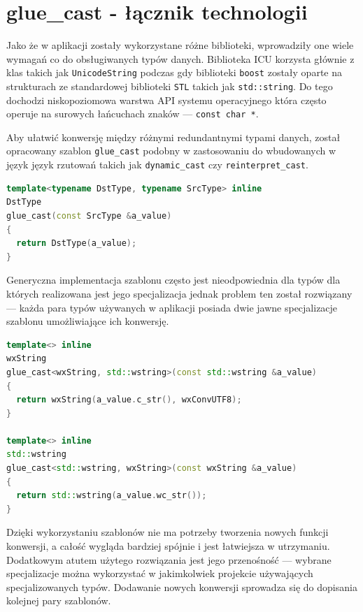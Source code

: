 \section{glue\_cast - łącznik technologii}
Jako że w aplikacji zostały wykorzystane różne biblioteki, wprowadziły one wiele wymagań co do obsługiwanych typów danych.
Biblioteka ICU korzysta głównie z klas takich jak \texttt{UnicodeString} podczas gdy biblioteki \texttt{boost} zostały oparte na strukturach ze standardowej biblioteki \texttt{STL} takich jak \texttt{std::string}. Do tego dochodzi niskopoziomowa warstwa API systemu operacyjnego która często operuje na surowych łańcuchach znaków --- \texttt{const char *}.
\par
Aby ułatwić konwersję między różnymi redundantnymi typami danych, został opracowany szablon \texttt{glue\_cast} podobny w zastosowaniu do wbudowanych w język język rzutowań takich jak \texttt{dynamic\_cast} czy \texttt{reinterpret\_cast}.

\begin{lstlisting}[caption={ glue.hpp}, language=C++]
template<typename DstType, typename SrcType> inline
DstType
glue_cast(const SrcType &a_value)
{
  return DstType(a_value);
}
\end{lstlisting}

\par
Generyczna implementacja szablonu często jest nieodpowiednia dla typów dla których realizowana jest jego specjalizacja jednak problem ten został rozwiązany --- każda para typów używanych w aplikacji posiada dwie jawne specjalizacje szablonu umożliwiające ich konwersję.
\begin{lstlisting}[caption={ Fragment glue\_impl.hpp --- specjalizacja dla std::wstring i wxString}, language=C++]
template<> inline
wxString
glue_cast<wxString, std::wstring>(const std::wstring &a_value)
{
  return wxString(a_value.c_str(), wxConvUTF8);
}

template<> inline
std::wstring
glue_cast<std::wstring, wxString>(const wxString &a_value)
{
  return std::wstring(a_value.wc_str());
}

\end{lstlisting}

\par
Dzięki wykorzystaniu szablonów nie ma potrzeby tworzenia nowych funkcji konwersji, a całość wygląda bardziej spójnie i jest łatwiejsza w utrzymaniu. Dodatkowym atutem użytego rozwiązania jest jego przenośność --- wybrane specjalizacje można wykorzystać w jakimkolwiek projekcie używających specjalizowanych typów. Dodawanie nowych konwersji sprowadza się do dopisania kolejnej pary szablonów.

